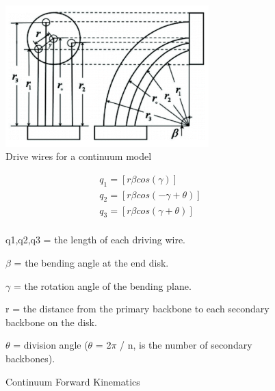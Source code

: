             \begin{figure}[H]
                    \centering
                    \includegraphics[width=0.7\textwidth]{figures/ContinuumModel.PNG}
                    \caption{Drive wires for a continuum model \cite{wang_li_xie_shen}}
                    \label{fig:ContinuumModel}
            \end{figure} 
            
            \begin{figure}[H]
            \centering
            \begin{gather*}
            q_1 = [r\beta cos(\gamma)]  \\
            q_2 = [r\beta cos(-\gamma + \theta)]  \\
            q_3 = [r\beta cos(\gamma + \theta)] \\
            \end{gather*}
            
              \begin{Deliverables}
                \item q1,q2,q3 = the length of each driving wire.
                \item $\beta$ = the bending angle at the end disk.
                \item $\gamma$ = the rotation angle of the bending plane.
                \item r = the distance from the primary backbone to each secondary backbone on the disk.
                \item $\theta$ = division angle ($\theta$ = 2$\pi$ / n, is the number of secondary backbones).
            \end{Deliverables}
            
            \caption{Continuum Forward Kinematics}
            \label{fig:FWKin_Continuum_Tail}
            \end{figure}
        
